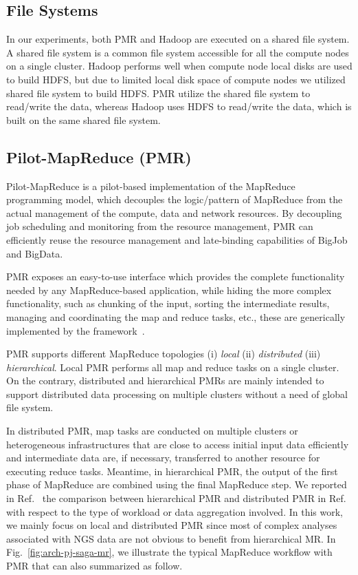 \documentclass{acm_proc_article-sp}
\begin{document}
\subsection{File Systems}

In our experiments, both PMR and Hadoop are executed on a shared file system.
A shared file system is a common file system accessible for all the compute nodes on a single cluster.
Hadoop performs well when compute node local disks are used to build HDFS, but due to limited local disk space of compute nodes we utilized shared file system to build HDFS. 
PMR utilize the shared file system to read/write the data, whereas Hadoop uses HDFS to read/write the data, which is built on the same shared file system.

\subsection{Pilot-MapReduce (PMR)}

Pilot-MapReduce is a pilot-based implementation of the MapReduce
programming model, which decouples the logic/pattern of MapReduce from
the actual management of the compute, data and network resources. By
decoupling job scheduling and monitoring from the resource management,
PMR can efficiently reuse the resource management and late-binding
capabilities of BigJob and BigData.

PMR exposes an easy-to-use interface which provides the complete
functionality needed by any MapReduce-based application, while hiding
the more complex functionality, such as chunking of the input, sorting
the intermediate results, managing and coordinating the map and reduce
tasks, etc., these are generically implemented by the
framework~\cite{pmr2012}.  

PMR supports different MapReduce topologies (i) \emph{local} (ii)
\emph{distributed} (iii) \emph{hierarchical}. Local PMR performs all
map and reduce tasks on a single cluster.  On the contrary, distributed and
hierarchical PMRs are mainly intended to support distributed data
processing  on multiple clusters without a need of global file system.

In distributed PMR, map tasks are conducted on multiple clusters or heterogeneous infrastructures that are close to access initial input data efficiently and intermediate data are, if necessary, transferred to another resource for executing reduce tasks.  Meantime, in hierarchical PMR, the
output of the first phase of MapReduce are combined using the final MapReduce
step.  We reported in Ref.~\cite{pmr2012} the comparison between hierarchical PMR and
distributed PMR in Ref. with respect to the type of workload or data aggregation involved. In this work, we mainly focus on local and distributed PMR since most of complex analyses associated with NGS data are not obvious to benefit from hierarchical MR.   In Fig.~\ref{fig:arch-pj-saga-mr}, we  illustrate the typical MapReduce workflow with PMR that can also summarized as follow.
\end{document}
